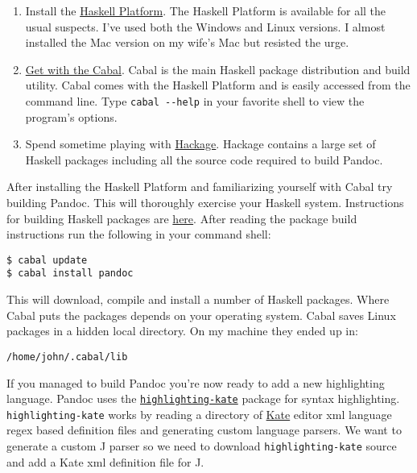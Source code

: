 \documentclass[]{article}
\begin{document}
\begin{enumerate}[1.]
\item
  Install the
  \href{http://hackage.haskell.org/platform/index.html}{Haskell
  Platform}. The Haskell Platform is available for all the usual
  suspects. I've used both the Windows and Linux versions. I almost
  installed the Mac version on my wife's Mac but resisted the urge.
\item
  \href{http://www.haskell.org/cabal/}{Get with the Cabal}. Cabal is the
  main Haskell package distribution and build utility. Cabal comes with
  the Haskell Platform and is easily accessed from the command line.
  Type \texttt{cabal -{}-help} in your favorite shell to view the
  program's options.
\item
  Spend sometime playing with
  \href{http://hackage.haskell.org/packages/hackage.html}{Hackage}.
  Hackage contains a large set of Haskell packages including all the
  source code required to build Pandoc.
\end{enumerate}

After installing the Haskell Platform and familiarizing yourself with
Cabal try building Pandoc. This will thoroughly exercise your Haskell
system. Instructions for building Haskell packages are
\href{http://www.haskell.org/haskellwiki/Cabal-Install}{here}. After
reading the package build instructions run the following in your command
shell:

\begin{verbatim}
$ cabal update
$ cabal install pandoc
\end{verbatim}

This will download, compile and install a number of Haskell packages.
Where Cabal puts the packages depends on your operating system. Cabal
saves Linux packages in a hidden local directory. On my machine they
ended up in:

\begin{verbatim}
/home/john/.cabal/lib
\end{verbatim}

If you managed to build Pandoc you're now ready to add a new
highlighting language. Pandoc uses the
\href{http://hackage.haskell.org/package/highlighting-kate-0.5.3.2}{\texttt{highlighting-kate}}
package for syntax highlighting. \texttt{highlighting-kate} works by
reading a directory of \href{http://kate-editor.org/}{Kate} editor xml
language regex based definition files and generating custom language
parsers. We want to generate a custom J parser so we need to download
\texttt{highlighting-kate} source and add a Kate xml definition file for
J.
\end{document}
